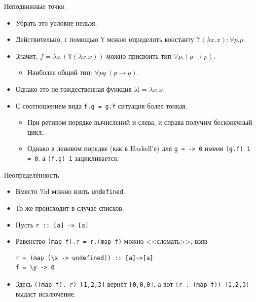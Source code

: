 \documentclass[xcolor=dvipsnames]{beamer}
\newcommand{\Yb}{\mathbb{Y}}
\begin{document}
\begin{frame}{Неподвижные точки}
 
 \begin{itemize}[<+->]
  \item Убрать это условие нельзя.
  \item Действительно, с помощью $\Yb$ можно определить константу $\Yb (\lambda x . x) : \forall p . p$.
  \item Значит, $f = \lambda z . (\Yb (\lambda x . x))$ можно присвоить тип $\forall p . (p \to p)$.
  \vspace*{-1em}
  \begin{itemize}[<+->]
  \item Наиболее общий тип: $\forall p q . (p \to q)$.
  \end{itemize}
  \item Однако это не тождественная функция $\mathrm{id} = \lambda x . x$.
  \item С соотношением вида \texttt{f.g = g.f} ситуация более тонкая.
  \begin{itemize}
  \item При ретивом порядке вычислений и слева, и справа получим бесконечный цикл.
  \item Однако в ленивом порядке (как в Haskell'е) для \texttt{g = \x -> 0}
  имеем \texttt{(g.f) 1 = 0}, а
  \texttt{(f.g) 1} зацикливается.
  \end{itemize}
 \end{itemize}

\end{frame}

\begin{frame}[fragile]{Неопределённость}
 
 \begin{itemize}[<+->]
  \item Вместо $\Yb \mathrm{id}$ можно взять {\tt undefined}.
  \item То же происходит в случае списков.
  \item Пусть \texttt{r :: [a] -> [a]}
  \item Равенство \texttt{(map f).r = r.(map f)} можно <<сломать>>, взяв
  \begin{verbatim}
r = (map (\x -> undefined)) :: [a]->[a]
f = \y -> 0
  \end{verbatim}
  \item Здесь \texttt{((map f). r) [1,2,3]} вернёт \texttt{[0,0,0]}, а вот \texttt{(r . (map f)) [1,2,3]} выдаст исключение.
 \end{itemize}

\end{frame}
\end{document}
